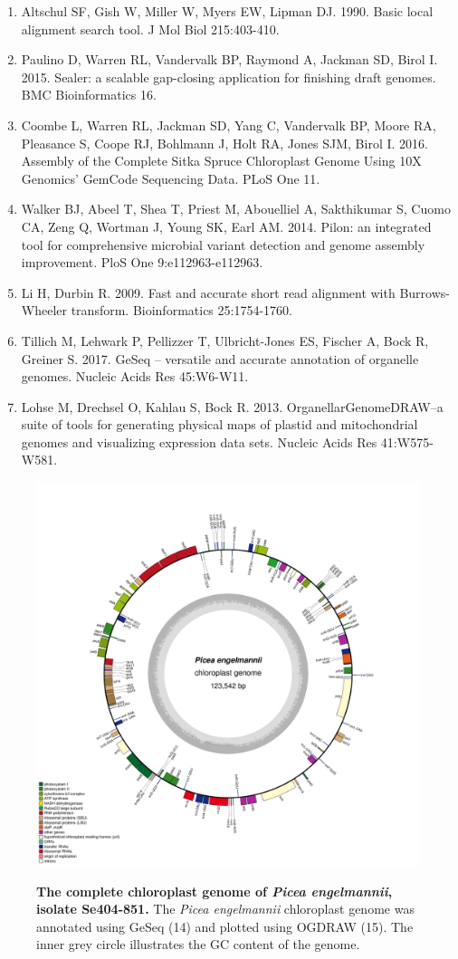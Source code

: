 \documentclass[titlepage,11pt, oneside]{article}   	%
\begin{document}
\begin{enumerate}
\item Altschul SF, Gish W, Miller W, Myers EW, Lipman DJ. 1990. Basic local alignment search tool. J Mol Biol 215:403-410.
\item Paulino D, Warren RL, Vandervalk BP, Raymond A, Jackman SD, Birol I. 2015. Sealer: a scalable gap-closing application for finishing draft genomes. BMC Bioinformatics 16.
\item Coombe L, Warren RL, Jackman SD, Yang C, Vandervalk BP, Moore RA, Pleasance S, Coope RJ, Bohlmann J, Holt RA, Jones SJM, Birol I. 2016. Assembly of the Complete Sitka Spruce Chloroplast Genome Using 10X Genomics’ GemCode Sequencing Data. PLoS One 11.
\item Walker BJ, Abeel T, Shea T, Priest M, Abouelliel A, Sakthikumar S, Cuomo CA, Zeng Q, Wortman J, Young SK, Earl AM. 2014. Pilon: an integrated tool for comprehensive microbial variant detection and genome assembly improvement. PloS One 9:e112963-e112963.
\item Li H, Durbin R. 2009. Fast and accurate short read alignment with Burrows-Wheeler transform. Bioinformatics 25:1754-1760.
\item Tillich M, Lehwark P, Pellizzer T, Ulbricht-Jones ES, Fischer A, Bock R, Greiner S. 2017. GeSeq – versatile and accurate annotation of organelle genomes. Nucleic Acids Res 45:W6-W11.
\item Lohse M, Drechsel O, Kahlau S, Bock R. 2013. OrganellarGenomeDRAW--a suite of tools for generating physical maps of plastid and mitochondrial genomes and visualizing expression data sets. Nucleic Acids Res 41:W575-W581.
\end{enumerate}
\begin{figure}[h]
\centering
\caption{\textbf{The complete chloroplast genome of \textit{Picea engelmannii}, isolate Se404-851.} The \textit{Picea engelmannii} chloroplast genome was annotated using GeSeq (14) and plotted using OGDRAW (15). The inner grey circle illustrates the GC content of the genome.}
\includegraphics[width=1.0\textwidth]{Se404-851}
\label{fig:ogdraw}
\end{figure}
\end{document}
